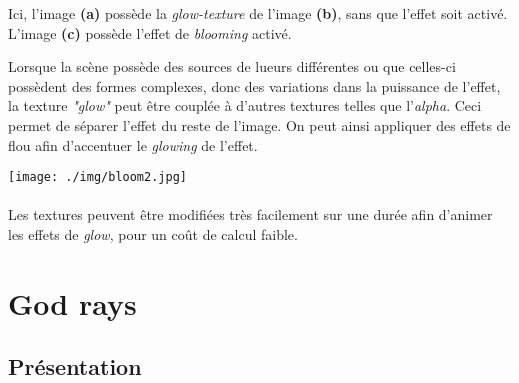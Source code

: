 \documentclass[a4paper]{article}
\begin{document}
Ici, l'image \textbf{(a)} possède la \textit{glow-texture} de l'image \textbf{(b)}, sans que l'effet soit activé. L'image \textbf{(c)} possède l'effet de \textit{blooming} activé.

Lorsque la scène possède des sources de lueurs différentes ou que celles-ci possèdent des formes complexes, donc des variations dans la puissance de l'effet, la texture \textit{"glow"} peut être couplée à d'autres textures telles que l'\textit{alpha}. Ceci permet de séparer l'effet du reste de l'image. On peut ainsi appliquer des effets de flou afin d'accentuer le \textit{glowing} de l'effet.
\vspace{0.2cm}
\begin{center}
\texttt{[image: ./img/bloom2.jpg]}
\end{center}

\paragraph{} Les textures peuvent être modifiées très facilement sur une durée afin d'animer les effets de \textit{glow}, pour un coût de calcul faible.















\section{God rays}

\subsection{Présentation}
\end{document}
